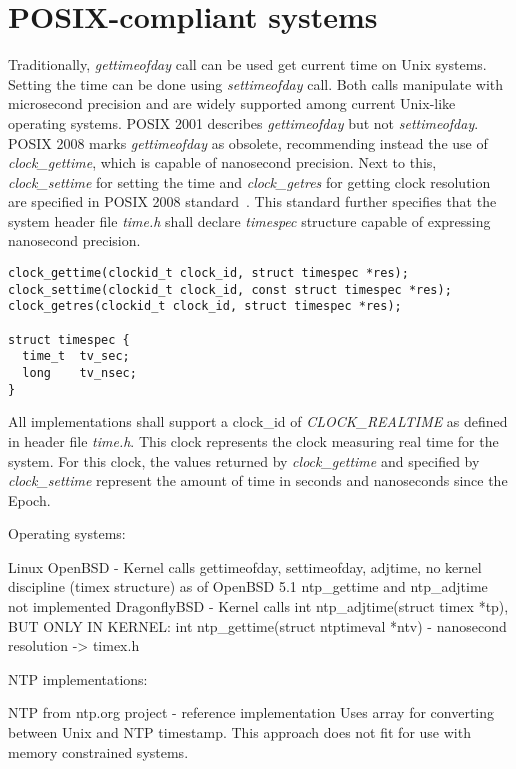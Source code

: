 
\section{POSIX-compliant systems}\label{sec:others-posix}
Traditionally, {\it{gettimeofday}} call can be used get current time on Unix systems.
Setting the time can be done using {\it{settimeofday}} call.
Both calls manipulate with microsecond precision and
are widely supported among current Unix-like operating systems.
POSIX 2001 describes {\it{gettimeofday}} but not {\it{settimeofday}}.
POSIX 2008 marks {\it{gettimeofday}} as obsolete, recommending instead the use
of {\it{clock\_gettime}}, which is capable of nanosecond precision.
Next to this, {\it{clock\_settime}} for setting the time and {\it{clock\_getres}}
for getting clock resolution are specified in POSIX 2008 standard~\cite{posix}.
This standard further specifies that
the system header file {\it{time.h}} shall declare {\it{timespec}} structure
capable of expressing nanosecond precision.
\begin{lstlisting}[morekeywords={clockid_t,time_t}]
clock_gettime(clockid_t clock_id, struct timespec *res);
clock_settime(clockid_t clock_id, const struct timespec *res);
clock_getres(clockid_t clock_id, struct timespec *res);

struct timespec {
  time_t  tv_sec;
  long    tv_nsec;
}
\end{lstlisting}
All implementations shall support a clock\_id of {\it{CLOCK\_REALTIME}} as
defined in header file {\it{time.h}}.
This clock represents the clock measuring real time for the system.
For this clock, the values returned by {\it{clock\_gettime}} and specified
by {\it{clock\_settime}} represent the amount
of time in seconds and nanoseconds since the Epoch.


Operating systems:

Linux
OpenBSD - Kernel calls gettimeofday, settimeofday, adjtime, no kernel discipline (timex structure)
as of OpenBSD 5.1 ntp\_gettime and ntp\_adjtime not implemented
DragonflyBSD - Kernel calls int ntp\_adjtime(struct timex *tp),
BUT ONLY IN KERNEL: int ntp\_gettime(struct ntptimeval *ntv) - nanosecond resolution -> timex.h

NTP implementations:

NTP from ntp.org project - reference implementation
Uses array for converting between Unix and NTP timestamp.
This approach does not fit for use with memory constrained systems.

